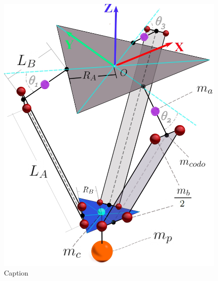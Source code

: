     \newpage
    
    
    \begin{figure}[htb]
        \centering
        \includegraphics[width=1\linewidth]{Main/Chapter5/Images5/DIBUJO43.jpg}
        \caption{Caption}
        \label{fig:cap5_1}
    \end{figure}
    
    
    